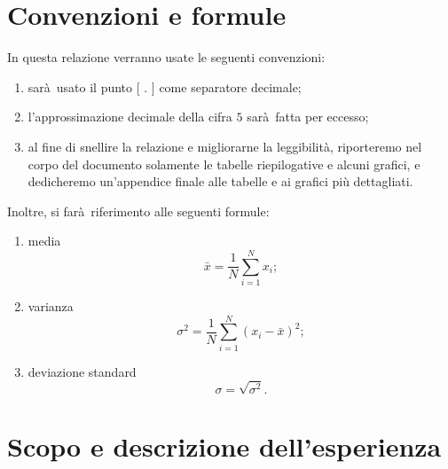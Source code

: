 \documentclass[10pt,oneside,a4paper]{article}
\begin{document}
\section{Convenzioni e formule}
In questa relazione verranno usate le seguenti convenzioni:
\begin{enumerate}
	\item sarà usato il punto [ $.$ ] come separatore decimale;
	\item l'approssimazione decimale della cifra $5$ sarà fatta per eccesso;
	\item al fine di snellire la relazione e migliorarne la leggibilità, riporteremo nel corpo del documento solamente le tabelle riepilogative e alcuni grafici, e dedicheremo un'appendice finale alle tabelle e ai grafici più dettagliati.
\end{enumerate}
Inoltre, si farà riferimento alle seguenti formule:
\begin{enumerate}
	\item media 
	\begin{equation}\label{eq:media}
	\bar{x} = \frac{1}{N}\sum_{i=1}^Nx_i;
	\end{equation}
	\item varianza
	\begin{equation}\label{eq:varianza}
	\sigma^2 = \frac{1}{N}\sum_{i=1}^N(x_i-\bar{x})^2;
	\end{equation}
	\item deviazione standard
	\begin{equation}\label{eq:deviazione}
	\sigma = \sqrt{\sigma^2}.
	\end{equation}	
\end{enumerate}

\section{Scopo e descrizione dell'esperienza}
\label{sec:descrizione}
\end{document}
